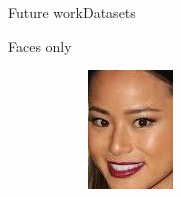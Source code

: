 \begin{frame}{Future work}{Datasets}
\begin{block}{Faces only}
\begin{figure}
\begin{subfigure}[b]{0.15\textwidth}
                \includegraphics[width=\textwidth]{sections/malte_slides/crop4}
            \end{subfigure}
            \begin{subfigure}[b]{0.15\textwidth}
                \centering

\end{subfigure}
\end{figure}
\end{block}
\end{frame}
